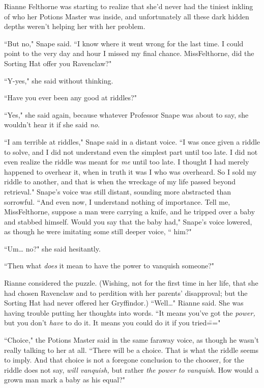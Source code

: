 Rianne Felthorne was starting to realize that she'd never had the tiniest inkling of who her Potions Master was inside, and unfortunately all these dark hidden depths weren't helping her with her problem.

``But no," Snape said. ``I know where it went wrong for the last time. I could point to the very day and hour I missed my final chance. Miss\?Felthorne, did the Sorting Hat offer you Ravenclaw?"

``Y-yes," she said without thinking.

``Have you ever been any good at riddles?"

``Yes," she said again, because whatever Professor Snape was about to say, she wouldn't hear it if she said \emph{no}.

``I am terrible at riddles," Snape said in a distant voice. ``I was once given a riddle to solve, and I did not understand even the simplest part until too late. I did not even realize the riddle was meant for \emph{me} until too late. I thought I had merely happened to overhear it, when in truth it was I who was overheard. So I sold my riddle to another, and that is when the wreckage of my life passed beyond retrieval." Snape's voice was still distant, sounding more abstracted than sorrowful. ``And even now, I understand nothing of importance. Tell me, Miss\?Felthorne, suppose a man were carrying a knife, and he tripped over a baby and stabbed himself. Would you say that the baby had," Snape's voice lowered, as though he were imitating some still deeper voice, `` him?"

``Um{\ldots} no?" she said hesitantly.

``Then what \emph{does} it mean to have the power to vanquish someone?"

Rianne considered the puzzle. (Wishing, not for the first time in her life, that she had chosen Ravenclaw and to perdition with her parents' disapproval; but the Sorting Hat had never offered her Gryffindor.) ``Well{\ldots}" Rianne said. She was having trouble putting her thoughts into words. ``It means you've got the \emph{power,} but you don't \emph{have} to do it. It means you could do it if you tried\==="

``Choice," the Potions Master said in the same faraway voice, as though he wasn't really talking to her at all. ``There will be a choice. That is what the riddle seems to imply. And that choice is not a foregone conclusion to the chooser, for the riddle does not say, \emph{will vanquish,} but rather \emph{the power to vanquish}. How would a grown man mark a baby as his equal?"

